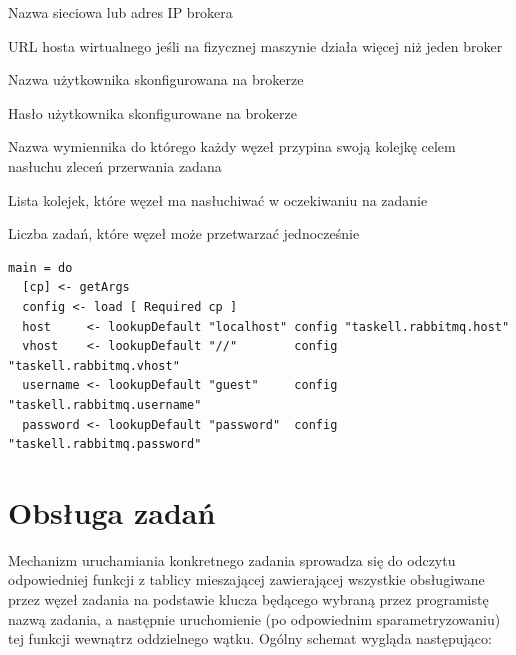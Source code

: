 \begin{description}[align=right,labelwidth=10cm,leftmargin=6cm]
  \item[taskell.rabbitmq.host] Nazwa sieciowa lub adres IP brokera
  \item[taskell.rabbitmq.vhost] URL hosta wirtualnego jeśli na fizycznej maszynie działa więcej niż jeden broker
  \item[taskell.rabbitmq.username] Nazwa użytkownika skonfigurowana na brokerze
  \item[taskell.rabbitmq.password] Hasło użytkownika skonfigurowane na brokerze
  \item[taskell.abortExchange] Nazwa wymiennika do którego każdy węzeł przypina swoją kolejkę celem nasłuchu zleceń przerwania zadana
  \item[taskell.queues] Lista kolejek, które węzeł ma nasłuchiwać w oczekiwaniu na zadanie
  \item[taskell.parallelism] Liczba zadań, które węzeł może przetwarzać jednocześnie
\end{description}
\begin{lstlisting}[caption=Odczyt konfiguracji]
main = do
  [cp] <- getArgs
  config <- load [ Required cp ]
  host     <- lookupDefault "localhost" config "taskell.rabbitmq.host"
  vhost    <- lookupDefault "//"        config "taskell.rabbitmq.vhost"
  username <- lookupDefault "guest"     config "taskell.rabbitmq.username"
  password <- lookupDefault "password"  config "taskell.rabbitmq.password"
\end{lstlisting}
\newpage
\section{Obsługa zadań}
Mechanizm uruchamiania konkretnego zadania sprowadza się do odczytu odpowiedniej funkcji z tablicy mieszającej zawierającej wszystkie obsługiwane przez węzeł zadania na podstawie klucza będącego wybraną przez programistę nazwą zadania, a następnie uruchomienie (po odpowiednim sparametryzowaniu) tej funkcji wewnątrz oddzielnego wątku. Ogólny schemat wygląda następująco:

